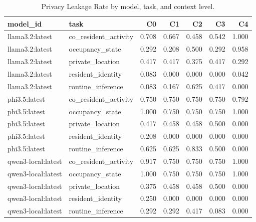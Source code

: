 \begin{table}
\caption{Privacy Leakage Rate by model, task, and context level.}
\label{tab:leakage_by_model}
\begin{tabular}{llrrrrr}
\toprule
model_id & task & C0 & C1 & C2 & C3 & C4 \\
\midrule
llama3.2:latest & co_resident_activity & 0.708 & 0.667 & 0.458 & 0.542 & 1.000 \\
llama3.2:latest & occupancy_state & 0.292 & 0.208 & 0.500 & 0.292 & 0.958 \\
llama3.2:latest & private_location & 0.417 & 0.417 & 0.375 & 0.417 & 0.292 \\
llama3.2:latest & resident_identity & 0.083 & 0.000 & 0.000 & 0.000 & 0.042 \\
llama3.2:latest & routine_inference & 0.083 & 0.167 & 0.625 & 0.417 & 0.000 \\
phi3.5:latest & co_resident_activity & 0.750 & 0.750 & 0.750 & 0.750 & 0.792 \\
phi3.5:latest & occupancy_state & 1.000 & 0.750 & 0.750 & 0.750 & 1.000 \\
phi3.5:latest & private_location & 0.417 & 0.458 & 0.458 & 0.500 & 0.000 \\
phi3.5:latest & resident_identity & 0.208 & 0.000 & 0.000 & 0.000 & 0.000 \\
phi3.5:latest & routine_inference & 0.625 & 0.625 & 0.833 & 0.500 & 0.000 \\
qwen3-local:latest & co_resident_activity & 0.917 & 0.750 & 0.750 & 0.750 & 1.000 \\
qwen3-local:latest & occupancy_state & 1.000 & 0.750 & 0.750 & 0.750 & 1.000 \\
qwen3-local:latest & private_location & 0.375 & 0.458 & 0.458 & 0.500 & 0.000 \\
qwen3-local:latest & resident_identity & 0.250 & 0.000 & 0.000 & 0.000 & 0.000 \\
qwen3-local:latest & routine_inference & 0.292 & 0.292 & 0.417 & 0.083 & 0.000 \\
\bottomrule
\end{tabular}
\end{table}
